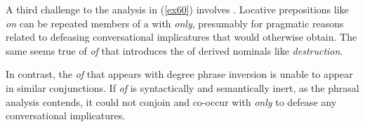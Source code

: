 \documentclass[output=paper,
modfonts
]{LSP/langsci}
\begin{document}
A third challenge to the analysis in ({\ref{ex60}}) involves .  Locative prepositions like {\textit{on}} can be repeated members of a  with {\textit{only}}, presumably for pragmatic reasons related to defeasing conversational implicatures that would otherwise obtain.  The same seems true of \textit{of} that introduces the  of derived nominals like {\textit{destruction}}.
\begin{exe}
\ex\label{ex63}
\begin{xlist}
\end{xlist}
\end{exe}
In contrast, the {\textit{of}} that appears with degree phrase inversion is unable to appear in similar conjunctions.  If {\textit{of}} is syntactically and semantically inert, as the phrasal  analysis contends, it could not conjoin and co-occur with {\textit{only}} to defease any conversational implicatures.
\begin{exe}
\ex \label{ex64}
\begin{xlist}
\end{xlist}
\end{exe}
\end{document}
